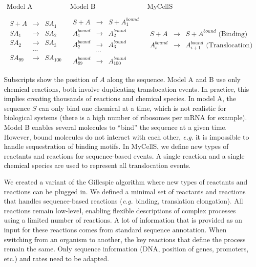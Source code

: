 \[
\begin{array}{c|c|c}
  \text{Model A} & \text{Model B} & \text{MyCellS}\\
  & & \\
  \begin{array}{rcl}
    S + A & \rightarrow & SA_1 \\
    SA_1 & \rightarrow & SA_2 \\
    SA_2 & \rightarrow & SA_3 \\
          & \cdots & \\
    SA_{99} & \rightarrow & SA_{100}
  \end{array}
  &
  \begin{array}{rcl}
    S + A & \rightarrow & S + A^{bound}_1 \\
    A^{bound}_1 & \rightarrow & A^{bound}_2 \\
    A^{bound}_2 & \rightarrow & A^{bound}_3 \\
          & \cdots & \\
    A^{bound}_{99} & \rightarrow & A^{bound}_{100}
  \end{array}
  &
  \begin{array}{rcl}
    S + A & \rightarrow & S + A^{bound} \text{ (Binding)} \\
    A^{bound}_i & \rightarrow & A^{bound}_{i+1} \text{ (Translocation)} \\
  \end{array}
\end{array}
\]

Subscripts show the position of $A$ along the sequence.
Model A and B use only chemical reactions, both involve duplicating
translocation events.
In practice, this implies creating thousands of reactions and chemical
species.
In model A, the sequence $S$ can only bind one chemical at a time,
which is not realistic for biological systems
(there is a high number of ribosomes per mRNA for example).
Model B enables several molecules to ``bind'' the sequence at a given time.
However, bound molecules do not interact with each other,
\textit{e.g.} it is impossible to handle sequestration of binding motifs.
In MyCellS, we define new types of reactants and reactions
for sequence-based events.
A single reaction and a single chemical species are used to represent
all translocation events.

We created a variant of the Gillespie algorithm where new types of reactants
and reactions can be plugged in.
We defined a minimal set of reactants and reactions that handles
sequence-based reactions (\textit{e.g.} binding, translation elongation).
All reactions remain low-level, enabling flexible descriptions of
complex processes using a limited number of reactions.
A lot of information that is provided as an input for these reactions comes from
standard sequence annotation.
When switching from an organism to another, the key reactions that define the
process remain the same.
Only sequence information (DNA, position of genes, promoters, etc.) and rates
need to be adapted.

